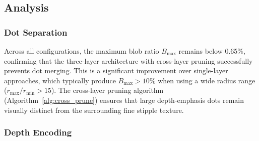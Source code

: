 \begin{table}[t]
\centering
\caption{Quantitative results across six palette--parameter
configurations using foreground-aware depth normalization.
$N_{\text{cc}}$: connected components; $B_{\max}$:
max.\ blob ratio; $C$: dot coverage; $R_{\text{fg}}$: foreground
ratio; $N_{\text{de}}$: depth-emphasis dots.}
\label{tab:results}
\small
\setlength{\tabcolsep}{3.5pt}
\end{table}

\subsection{Analysis}

\subsubsection{Dot Separation}

Across all configurations, the maximum blob ratio $B_{\max}$ remains
below 0.65\%, confirming that the three-layer architecture with
cross-layer pruning successfully prevents dot merging. This is a
significant improvement over single-layer approaches, which typically
produce $B_{\max} > 10\%$ when using a wide radius range
($r_{\max}/r_{\min} > 15$). The cross-layer pruning algorithm
(Algorithm~\ref{alg:cross_prune}) ensures that large depth-emphasis
dots remain visually distinct from the surrounding fine stipple
texture.

\subsubsection{Depth Encoding}

